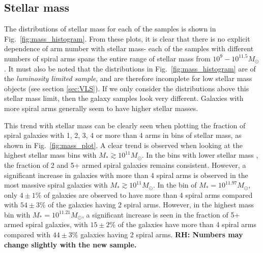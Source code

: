 \documentclass[useAMS,usenatbib]{mn2e}
\newcommand{\rh}[1]{{\bf \textcolor{RoyalPurple}{RH: #1}}}
\begin{document}
\subsection{Stellar mass}
\label{sec:mass}

The distributions of stellar mass for each of the samples is shown in Fig.~\ref{fig:mass_histogram}. From these plots, it is clear that there is no explicit dependence of arm number with stellar mass- each of the samples with different numbers of spiral arms spans the entire range of stellar mass from $10^{9} - 10^{11.5} M_{\odot}$. It must also be noted that the distributions in Fig.~\ref{fig:mass_histogram} are of the \textit{luminosity limited sample}, and are therefore incomplete for low stellar mass objects (see section \ref{sec:VLS}). If we only consider the distributions above this stellar mass limit, then the galaxy samples look very different. Galaxies with more spiral arms generally seem to have higher stellar masses.

This trend with stellar mass can be clearly seen when plotting the fraction of spiral galaxies with 1, 2, 3, 4 or more than 4 arms in bins of stellar mass, as shown in Fig.~\ref{fig:mass_plot}. A clear trend is observed when looking at the highest stellar mass bins with $M_* \gtrsim 10^{11} M_{\odot}$. In the bins with lower stellar mass , the fraction of 2 and 5+ armed spiral galaxies remains consistent. However, a significant increase in galaxies with more than 4 spiral arms is observed in the most massive spiral galaxies with $M_* \gtrsim 10^{11} M_{\odot}$. In the bin of $M_* = 10^{11.97}M_{\odot}$, only $4 \pm 1 \%$ of galaxies are observed to have more than 4 spiral arms compared with $54 \pm 3 \%$ of the galaxies having 2 spiral arms. However, in the highest mass bin with $M_* = 10^{11.21}M_{\odot}$, a significant increase is seen in the fraction of 5+ armed spiral galaxies, with $15 \pm 2 \%$ of the galaxies have more than 4 spiral arms compared with $44 \pm 3 \%$ galaxies having 2 spiral arms. \rh{Numbers may change slightly with the new sample.}
\end{document}
